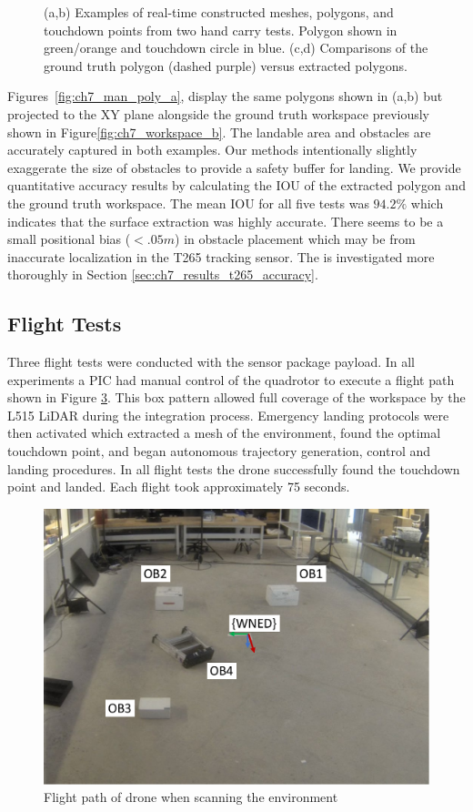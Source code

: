 \begin{figure}[!htb]
\begin{subfigure}[t]{.30\linewidth}
    \caption{\label{fig:ch7_man_poly_b}}
  \end{subfigure}
   \caption[Real-time Constructed Meshes and Polygons During Hand Carry Test]{(a,b) Examples of real-time constructed meshes, polygons, and touchdown points from two hand carry tests. Polygon shown in green/orange and touchdown circle in blue. (c,d) Comparisons of the ground truth polygon (dashed purple) versus extracted polygons.} \label{fig:ch7_mesh_handcarry}
\end{figure}

Figures~\ref{fig:ch7_man_poly_a}, display the same polygons shown in (a,b) but projected to the XY plane alongside the ground truth workspace previously shown in Figure\ref{fig:ch7_workspace_b}. The landable area and obstacles are accurately captured in both examples. Our methods intentionally slightly exaggerate the size of obstacles to provide a safety buffer for landing.  We provide quantitative accuracy results by calculating the \ac{IOU} of the extracted polygon and the ground truth workspace.  The mean \ac{IOU} for all five tests was $94.2\%$ which indicates that the surface extraction was highly accurate. There seems to be a small positional bias ($< .05m$) in obstacle placement which may be from inaccurate localization in the T265 tracking sensor. The is investigated more thoroughly in Section \ref{sec:ch7_results_t265_accuracy}.


\subsection{Flight Tests} \label{sec:ch7_results_flight}

Three flight tests were conducted with the sensor package payload. In all experiments a \ac{PIC} had manual control of the quadrotor to execute a flight path shown in Figure \ref{fig:ch7_flight_path}. This box pattern allowed full coverage of the workspace by the L515 LiDAR during the integration process. Emergency landing protocols were then activated which extracted a mesh of the environment, found the optimal touchdown point, and began autonomous trajectory generation, control and landing procedures. In all flight tests the drone successfully found the touchdown point and landed. Each flight took approximately 75 seconds.

\begin{figure}[!tb]
    \centering  
    \includegraphics[page=3,clip,trim=0cm 0cm 0cm 0cm,width=.45\linewidth]{chapter_7_experiments/imgs/ExperimentSetup.pdf}
    \caption[Flight path for scanning environment]{Flight path of drone when scanning the environment}\label{fig:ch7_flight_path}
\end{figure}

